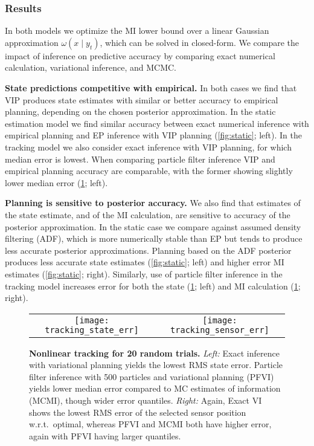 \subsubsection{Results}

In both models we optimize the MI lower bound over a linear Gaussian
approximation $\omega(x \mid y_t)$, which can be solved in
closed-form.  We compare the impact of inference on predictive
accuracy by comparing exact numerical calculation, variational
inference, and MCMC.

\textbf{State predictions competitive with empirical.}  In both cases
we find that VIP produces state estimates with similar or better
accuracy to empirical planning, depending on the chosen posterior
approximation.  In the static estimation model we find similar
accuracy between exact numerical inference with empirical planning and
EP inference with VIP planning (\FIG\ref{fig:static}; left).  In the
tracking model we also consider exact inference with VIP planning, for
which median error is lowest.  When comparing particle filter
inference VIP and empirical planning accuracy are comparable, with the
former showing slightly lower median error (\FIG\ref{fig:dynamic};
left).

\textbf{Planning is sensitive to posterior accuracy.}  We also find
that estimates of the state estimate, and of the MI calculation, are
sensitive to accuracy of the posterior approximation.  In the static
case we compare against assumed density filtering (ADF), which is more
numerically stable than EP but tends to produce less accurate
posterior approximations.  Planning based on the ADF posterior
produces less accurate state estimates (\FIG\ref{fig:static}; left)
and higher error MI estimates (\FIG\ref{fig:static}; right).
Similarly, use of particle filter inference in the tracking model
increases error for both the state (\FIG\ref{fig:dynamic}; left) and
MI calculation (\FIG\ref{fig:dynamic}; right).



\begin{figure}
  \begin{tabular}{cc}
    \hspace{-3mm}\texttt{[image: tracking\_state\_err]} &
    \hspace{-3mm}\texttt{[image: tracking\_sensor\_err]}
  \end{tabular}
  
  \caption{\small\textbf{Nonlinear tracking for 20 random
  trials.}  \emph{Left:} Exact inference with variational planning
  yields the lowest RMS state error.  Particle filter inference with
  500 particles and variational planning (PFVI) yields lower median
  error compared to MC estimates of information (MCMI), though wider
  error quantiles.  \emph{Right:} Again, Exact VI shows the lowest RMS
  error of the selected sensor position w.r.t.~optimal, whereas PFVI
  and MCMI both have higher error, again with PFVI having larger
  quantiles.}
  \label{fig:dynamic}
\end{figure}






